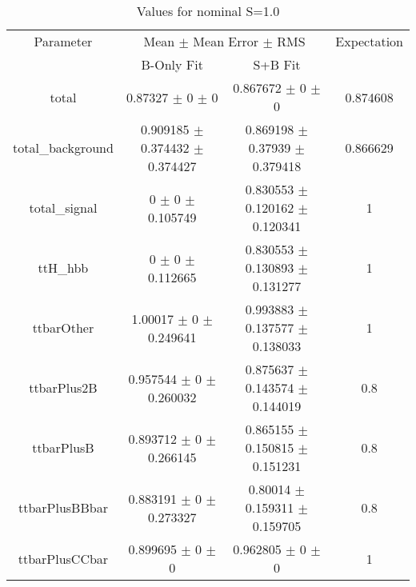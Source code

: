 \begin{table}
\centering
\caption{Values for nominal S=1.0}
\begin{tabular}{cccc}
\toprule
Parameter & \multicolumn{2}{c}{Mean $\pm$ Mean Error $\pm$ RMS} & Expectation\\
 & B-Only Fit & S+B Fit & \\
\midrule
total & \num{0.87327} $\pm$ \num{0} $\pm$ \num{0} & \num{0.867672} $\pm$ \num{0} $\pm$ \num{0} & \num{0.874608}\\
total\_background & \num{0.909185} $\pm$ \num{0.374432} $\pm$ \num{0.374427} & \num{0.869198} $\pm$ \num{0.37939} $\pm$ \num{0.379418} & \num{0.866629}\\
total\_signal & \num{0} $\pm$ \num{0} $\pm$ \num{0.105749} & \num{0.830553} $\pm$ \num{0.120162} $\pm$ \num{0.120341} & \num{1}\\
ttH\_hbb & \num{0} $\pm$ \num{0} $\pm$ \num{0.112665} & \num{0.830553} $\pm$ \num{0.130893} $\pm$ \num{0.131277} & \num{1}\\
ttbarOther & \num{1.00017} $\pm$ \num{0} $\pm$ \num{0.249641} & \num{0.993883} $\pm$ \num{0.137577} $\pm$ \num{0.138033} & \num{1}\\
ttbarPlus2B & \num{0.957544} $\pm$ \num{0} $\pm$ \num{0.260032} & \num{0.875637} $\pm$ \num{0.143574} $\pm$ \num{0.144019} & \num{0.8}\\
ttbarPlusB & \num{0.893712} $\pm$ \num{0} $\pm$ \num{0.266145} & \num{0.865155} $\pm$ \num{0.150815} $\pm$ \num{0.151231} & \num{0.8}\\
ttbarPlusBBbar & \num{0.883191} $\pm$ \num{0} $\pm$ \num{0.273327} & \num{0.80014} $\pm$ \num{0.159311} $\pm$ \num{0.159705} & \num{0.8}\\
ttbarPlusCCbar & \num{0.899695} $\pm$ \num{0} $\pm$ \num{0} & \num{0.962805} $\pm$ \num{0} $\pm$ \num{0} & \num{1}\\
\bottomrule
\end{tabular}
\end{table}